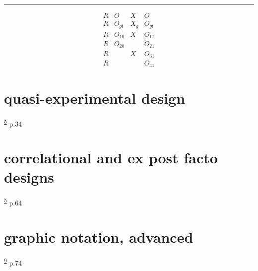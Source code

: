 \documentclass[
]{book}
\theoremstyle{definition}
\theoremstyle{definition}
\theoremstyle{definition}
\theoremstyle{definition}
\theoremstyle{remark}
\begin{document}
\begin{center}\rule{0.5\linewidth}{0.5pt}\end{center}

\[
\begin{array}{cccc}
R & O & X & O\\
R & O_{gt} & X_{g} & O_{gt}\\
R & O_{10} & X & O_{11}\\
R & O_{20} &  & O_{21}\\
R &  & X & O_{31}\\
R &  &  & O_{41}
\end{array}
\]

\hypertarget{quasi-experimental-design}{%
\section{quasi-experimental design}\label{quasi-experimental-design}}

\textsuperscript{\protect\hyperlink{ref-campbell1963}{5}} p.34

\hypertarget{correlational-and-ex-post-facto-designs}{%
\section{correlational and ex post facto designs}\label{correlational-and-ex-post-facto-designs}}

\textsuperscript{\protect\hyperlink{ref-campbell1963}{5}} p.64

\hypertarget{graphic-notation-advanced}{%
\section{graphic notation, advanced}\label{graphic-notation-advanced}}

\textsuperscript{\protect\hyperlink{ref-hu2022}{9}} p.74
\end{document}

